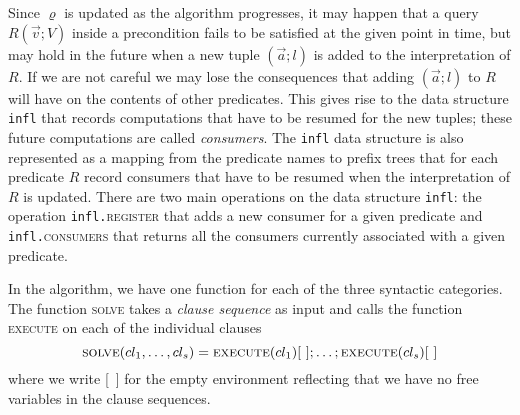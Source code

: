Since $\varrho$ is updated as the algorithm progresses, it may
happen that a query $R(\vec v; V)$ inside a precondition fails to be
satisfied at the given point in time, but may hold in the future when
a new tuple $(\vec a; l)$ is added to the interpretation of $R$. If we
are not careful we may lose the consequences that adding $(\vec a; l)$
to $R$ will have on the contents of other predicates. This gives rise
to the data structure \texttt{infl} that records computations that
have to be resumed for the new tuples; these future computations are
called \emph{consumers}. The \texttt{infl} data structure is also
represented as a mapping from the predicate names to prefix trees that
for each predicate $R$ record consumers that have to be resumed when
the interpretation of $R$ is updated. There are two main operations on
the data structure {\tt infl}: the operation
\texttt{infl.}\textsc{register} that adds a new consumer for a given
predicate and \texttt{infl.}\textsc{consumers} that returns all the
consumers currently associated with a given predicate.

In the algorithm, we have one function for each of the three syntactic
categories. The function \textsc{solve} takes a \emph{clause sequence}
as input and calls the function \textsc{execute} on each of the
individual clauses
\[
\textsc{solve}(cl_1,\ldots,cl_s) =\textsc{execute}(cl_1)[\ ]; \ldots;
\textsc{execute}(cl_s)[\ ]
\]
where we write [\ ] for the empty environment reflecting that we have
no free variables in the clause sequences.

